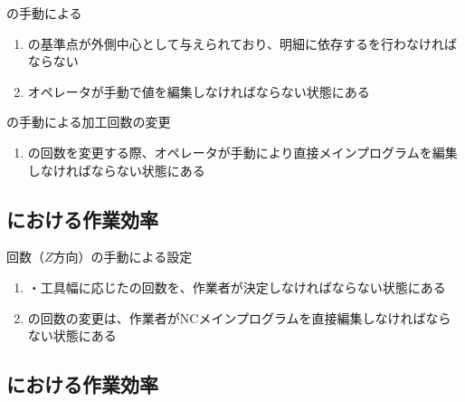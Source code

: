 \begin{Issues}{\EndFacecutMilling の手動による\TDCorrection}
\begin{enumerate}[label=\sarrow]
\item[{\sarrow[red]}]\EndFacecutMilling の基準点が外側中心として与えられており、明細に依存する\indexTDFaceMill\nameTDCorrection を行わなければならない
\item[{\sarrow[red]}]オペレータが手動で\indexTDFaceMill\nameTDCorrection 値を編集しなければならない状態にある
\end{enumerate}
\end{Issues}

\begin{Issues}{\EndFacecutMilling の手動による加工回数の変更}
\begin{enumerate}[label=\sarrow]
\item[{\sarrow[red]}]\EndFacecutMilling の回数を変更する際、オペレータが手動により直接メインプログラムを編集しなければならない状態にある
\end{enumerate}
\end{Issues}


\subsection{\KeywayMilling における作業効率}

\begin{Issues}{\KeywayMilling 回数（$Z$方向）の手動による設定}
\begin{enumerate}[label=\sarrow]
\item[{\sarrow[red]}]\KeywayWidth・工具幅に応じた\KeywayMilling の回数を、作業者が決定しなければならない状態にある
\item[{\sarrow[red]}]\KeywayMilling の回数の変更は、作業者がNCメインプログラムを直接編集しなければならない状態にある
\end{enumerate}
\end{Issues}


\subsection{\EndFaceChamferMilling における作業効率}

